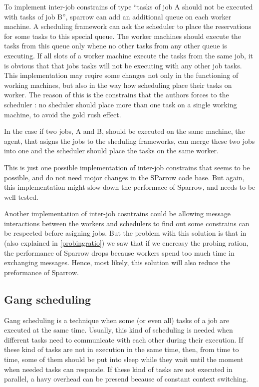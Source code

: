 \documentclass[11pt]{article}
\begin{document}
		To implement inter-job constrains of type ``tasks of job A should not be executed with tasks of job B'', sparrow can add an additional queue on each worker machine. A scheduling framework can ask the scheduler to place the reservations for some tasks to this special queue. The worker machines should execute the tasks from this queue only whene no other tasks from any other queue is executing. If all slots of a worker machine execute the tasks from the same job, it is obvious that that jobs tasks will not be executing with any other job tasks. This implementation may reqire some changes not only in the functioning of working machines, but also in the way how scheduling place their tasks on worker. The reason of this is the constrains that the authors forces to the scheduler \cite[section 5]{sparrow}: no sheduler should place more than one task on a single working machine, to avoid the gold rush effect.
		
		In the case if two jobs, A and B, should be executed on the same machine, the agent, that asigns the jobs to the sheduling frameworks, can merge these two jobs into one and the scheduler should place the tasks on the same worker.
		
		This is just one possible implementation of inter-job constrains that seems to be possible, and do not need mojor changes in the SParrow code base. But again, this implementation might slow down the performace of Sparrow, and needs to be well tested.
		
		Another implementation of inter-job cosntrains could be allowing message interactions between the workers and schedulers to find out some constrains can be respected before asigning jobs. But the problem with this solution is that in \cite[subsection 7.9]{sparrow} (also explained in \ref{probingratio}) we saw that if we encreasy the probing ration, the performance of Sparrow drops because workers spend too much time in exchanging messages. Hence, most likely, this solution will also reduce the preformance of Sparrow.

	\subsection{Gang scheduling}
	
		Gang scheduling is a technique when some (or even all) tasks of a job are executed at the same time. Usually, this kind of scheduling is needed when different tasks need to communicate with each other during their execution. If these kind of tasks are not in execution in the same time, then, from time to time, some of them should be put into sleep while they wait until the moment when needed tasks can responde. If these kind of tasks are not executed in parallel, a havy overhead can be presend because of constant context switching.
		
\end{document}

